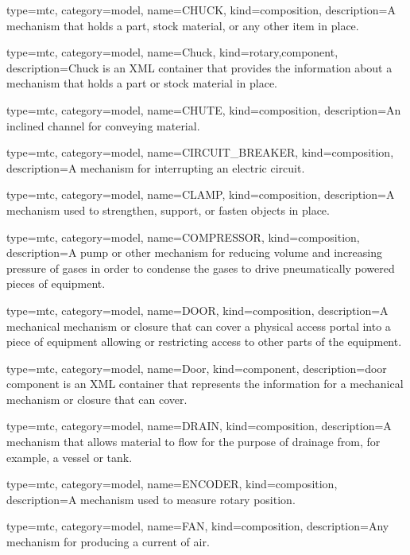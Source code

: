 {
  type=mtc,
  category=model,
  name={CHUCK},
  kind={composition},
  description={A mechanism that holds a part, stock material, or any other item in place.}
}


{
  type=mtc,
  category=model,
  name={Chuck},
  kind={rotary,component},
  description={Chuck is an XML container that provides the information about a mechanism that holds a part or stock material in place.}
}


{
  type=mtc,
  category=model,
  name={CHUTE},
  kind={composition},
  description={An inclined channel for conveying material.}
}


{
  type=mtc,
  category=model,
  name={CIRCUIT\_BREAKER},
  kind={composition},
  description={A mechanism for interrupting an electric circuit.}
}


{
  type=mtc,
  category=model,
  name={CLAMP},
  kind={composition},
  description={A mechanism used to strengthen, support, or fasten objects in place.}
}


{
  type=mtc,
  category=model,
  name={COMPRESSOR},
  kind={composition},
  description={A pump or other mechanism for reducing volume and increasing pressure of gases in order to condense the gases to drive pneumatically powered pieces of equipment.}
}


{
  type=mtc,
  category=model,
  name={DOOR},
  kind={composition},
  description={A mechanical mechanism or closure that can cover a physical access portal into a piece of equipment allowing or restricting access to other parts of the equipment.}
}


{
  type=mtc,
  category=model,
  name={Door},
  kind={component},
  description={\gls{door component} is an XML container that represents the information for a mechanical mechanism or closure that can cover.}
}


{
  type=mtc,
  category=model,
  name={DRAIN},
  kind={composition},
  description={A mechanism that allows material to flow for the purpose of drainage from, for example, a vessel or tank.}
}


{
  type=mtc,
  category=model,
  name={ENCODER},
  kind={composition},
  description={A mechanism used to measure rotary position.}
}


{
  type=mtc,
  category=model,
  name={FAN},
  kind={composition},
  description={Any mechanism for producing a current of air.}
}


